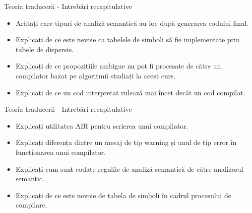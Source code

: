 \documentclass[pdf]{beamer}
\begin{document}
\begin{frame}{Teoria traducerii - Intrebări recapitulative}
\begin{itemize}
\item
Arătați care tipuri de analiză semantică au loc după generarea codului final.
\newline

\item
Explicați de ce este nevoie ca tabelele de simboli să fie implementate prin tabele de dispersie.
\newline

\item
Explicați de ce propozițiile ambigue nu pot fi procesate de către un compilator bazat pe algoritmii studiați la acest curs. 
\newline

\item
Explicați de ce un cod interpretat rulează mai încet decât un cod compilat.
\end{itemize}
\end{frame}



\begin{frame}{Teoria traducerii - Intrebări recapitulative}
\begin{itemize}
\item
Explicați utilitatea ABI pentru scrierea unui compilator.
\newline

\item
Explicați diferența dintre un mesaj de tip warning și unul de tip error în funcționarea unui compilator.
\newline

\item
Explicați cum sunt codate regulile de analiză semantică de către analizorul semantic.
\newline

\item
Explicați de ce este nevoie de tabela de simboli în cadrul procesului de compilare.

\end{itemize}
\end{frame}
\end{document}
